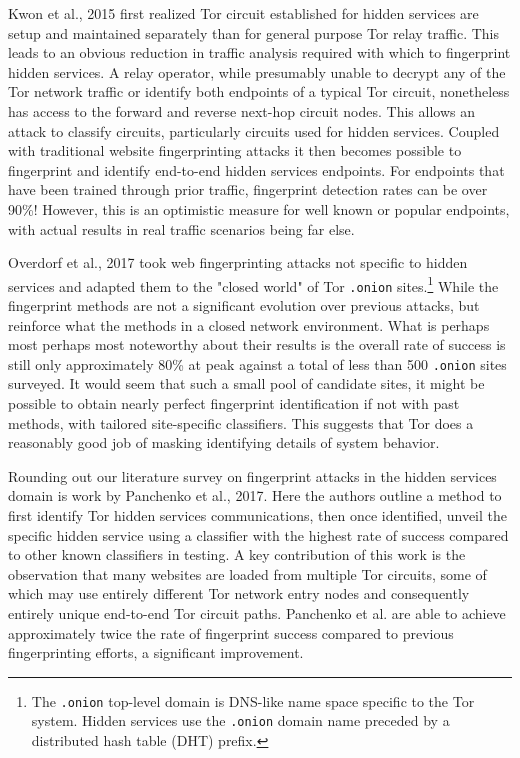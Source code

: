 \documentclass[sigconf]{acmart}
\begin{document}
Kwon et al., 2015 \cite{kwon_circuit_2015} first realized Tor circuit
established for hidden services are setup and maintained separately than
for general purpose Tor relay traffic.  This leads to an obvious
reduction in traffic analysis required with which to fingerprint hidden
services.  A relay operator, while presumably unable to decrypt any of
the Tor network traffic or identify both endpoints of a typical Tor
circuit, nonetheless has access to the forward and reverse next-hop
circuit nodes.  This allows an attack to classify circuits, particularly
circuits used for hidden services.  Coupled with traditional website
fingerprinting attacks it then becomes possible to fingerprint and
identify end-to-end hidden services endpoints.  For endpoints that have
been trained through prior traffic, fingerprint detection rates can be
over 90\%!  However, this is an optimistic measure for well known or
popular endpoints, with actual results in real traffic scenarios being
far else.

Overdorf et al., 2017 \cite{overdorf_how_2017} took web fingerprinting
attacks not specific to hidden services and adapted them to the "closed
world" of Tor \texttt{.onion} sites.\footnote{The \texttt{.onion}
top-level domain is DNS-like name space specific to the Tor system.
Hidden services use the \texttt{.onion} domain name preceded by a
distributed hash table (DHT) prefix.}  While the fingerprint methods are
not a significant evolution over previous attacks, but reinforce what
the methods in a closed network environment.  What is perhaps most
perhaps most noteworthy about their results is the overall rate of
success is still only approximately 80\% at peak against a total of less
than 500 \texttt{.onion} sites surveyed.  It would seem that such a
small pool of candidate sites, it might be possible to obtain nearly
perfect fingerprint identification if not with past methods, with
tailored site-specific classifiers.  This suggests that Tor does a
reasonably good job of masking identifying details of system behavior.

Rounding out our literature survey on fingerprint attacks in the hidden
services domain is work by Panchenko et al.,
2017\cite{panchenko_analysis_2017}.  Here the authors outline a method to first
identify Tor hidden services communications, then once identified,
unveil the specific hidden service using a classifier with the highest
rate of success compared to other known classifiers in testing.  A key
contribution of this work is the observation that many websites are
loaded from multiple Tor circuits, some of which may use entirely
different Tor network entry nodes and consequently entirely unique
end-to-end Tor circuit paths.  Panchenko et al. are able to achieve
approximately twice the rate of fingerprint success compared to previous
fingerprinting efforts, a significant improvement.
\end{document}
